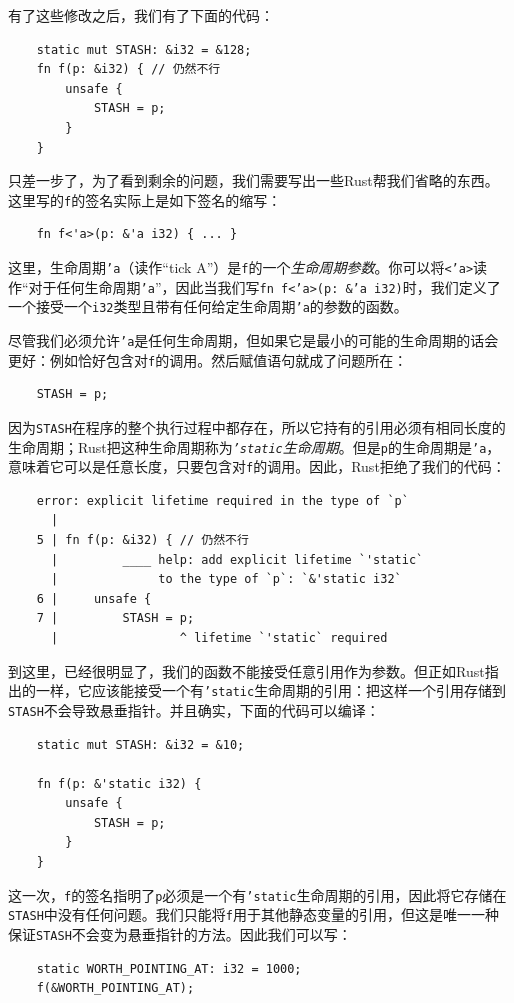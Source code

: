 有了这些修改之后，我们有了下面的代码：
\begin{verbatim}
    static mut STASH: &i32 = &128;
    fn f(p: &i32) { // 仍然不行
        unsafe {
            STASH = p;
        }
    }
\end{verbatim}

只差一步了，为了看到剩余的问题，我们需要写出一些Rust帮我们省略的东西。这里写的\texttt{f}的签名实际上是如下签名的缩写：
\begin{verbatim}
    fn f<'a>(p: &'a i32) { ... }
\end{verbatim}

这里，生命周期\texttt{'a}（读作“tick A”）是\texttt{f}的一个\emph{生命周期参数}。你可以将\texttt{<'a>}读作“对于任何生命周期\texttt{'a}”，因此当我们写\texttt{fn f<'a>(p: \&'a i32)}时，我们定义了一个接受一个\texttt{i32}类型且带有任何给定生命周期\texttt{'a}的参数的函数。

尽管我们必须允许\texttt{'a}是任何生命周期，但如果它是最小的可能的生命周期的话会更好：例如恰好包含对\texttt{f}的调用。然后赋值语句就成了问题所在：
\begin{verbatim}
    STASH = p;
\end{verbatim}

因为\texttt{STASH}在程序的整个执行过程中都存在，所以它持有的引用必须有相同长度的生命周期；Rust把这种生命周期称为\emph{\texttt{'static}生命周期}。但是\texttt{p}的生命周期是\texttt{'a}，意味着它可以是任意长度，只要包含对\texttt{f}的调用。因此，Rust拒绝了我们的代码：
\begin{verbatim}
    error: explicit lifetime required in the type of `p`
      |
    5 | fn f(p: &i32) { // 仍然不行
      |         ____ help: add explicit lifetime `'static`
      |              to the type of `p`: `&'static i32`
    6 |     unsafe {
    7 |         STASH = p;
      |                 ^ lifetime `'static` required
\end{verbatim}

到这里，已经很明显了，我们的函数不能接受任意引用作为参数。但正如Rust指出的一样，它应该能接受一个有\texttt{'static}生命周期的引用：把这样一个引用存储到\texttt{STASH}不会导致悬垂指针。并且确实，下面的代码可以编译：
\begin{verbatim}
    static mut STASH: &i32 = &10;

    fn f(p: &'static i32) {
        unsafe {
            STASH = p;
        }
    }
\end{verbatim}

这一次，\texttt{f}的签名指明了\texttt{p}必须是一个有\texttt{'static}生命周期的引用，因此将它存储在\texttt{STASH}中没有任何问题。我们只能将\texttt{f}用于其他静态变量的引用，但这是唯一一种保证\texttt{STASH}不会变为悬垂指针的方法。因此我们可以写：
\begin{verbatim}
    static WORTH_POINTING_AT: i32 = 1000;
    f(&WORTH_POINTING_AT);
\end{verbatim}

